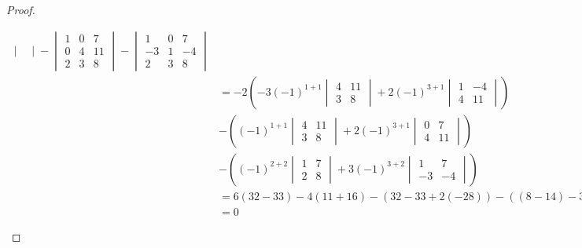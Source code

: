 \begin{proof}
\begin{enumerate}[(i)]
\[\begin{aligned}
\begin{vmatrix}
                \end{vmatrix}
                -\begin{vmatrix}
                    1 & 0 & 7\\
                    0 & 4 & 11\\
                    2 & 3 & 8
                \end{vmatrix}
                -\begin{vmatrix}
                    1 & 0 & 7\\
                    -3 & 1 & -4\\
                    2 & 3 & 8
                \end{vmatrix}\\
                &=-2\left(-3(-1)^{1+1}\begin{vmatrix}
                    4 & 11\\
                    3 & 8
                \end{vmatrix}+2(-1)^{3+1}\begin{vmatrix}
                    1 & -4\\
                    4 & 11
                \end{vmatrix}\right)\\
                &-\left(
                    (-1)^{1+1}\begin{vmatrix}
                        4 & 11\\
                        3 & 8
                    \end{vmatrix}+2(-1)^{3+1}\begin{vmatrix}
                        0 & 7\\
                        4 & 11
                    \end{vmatrix}
                \right)\\
                &-\left(
                    (-1)^{2+2}\begin{vmatrix}
                        1 & 7\\
                        2 & 8
                    \end{vmatrix}+3(-1)^{3+2}\begin{vmatrix}
                        1 & 7\\
                        -3 & -4
                    \end{vmatrix}
                \right)\\
                &=6(32-33)-4(11+16)-(32-33+2(-28))-((8-14)-3(-4+21))\\
                &=0

\end{aligned}\]
\end{enumerate}
\end{proof}
